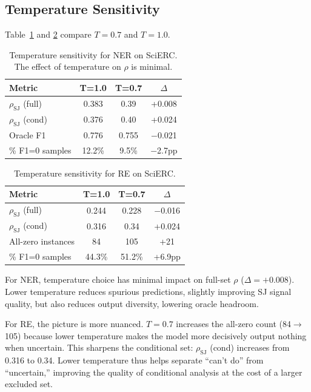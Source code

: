 \documentclass[11pt]{article}
\begin{document}
\subsection{Temperature Sensitivity}
\label{sec:temperature}

Table~\ref{tab:temp_ner} and \ref{tab:temp_re} compare $T{=}0.7$ and $T{=}1.0$.

\begin{table}[t]
\centering
\caption{Temperature sensitivity for NER on SciERC. The effect of temperature on $\rho$ is minimal.}
\label{tab:temp_ner}
\begin{tabular}{lccc}
\toprule
\textbf{Metric} & \textbf{T=1.0} & \textbf{T=0.7} & \textbf{$\Delta$} \\
\midrule
$\rho_{\text{SJ}}$ (full) & 0.383 & 0.39 & +0.008 \\
$\rho_{\text{SJ}}$ (cond) & 0.376 & 0.40 & +0.024 \\
Oracle F1                  & 0.776 & 0.755 & $-$0.021 \\
\% F1=0 samples            & 12.2\% & 9.5\% & $-$2.7pp \\
\bottomrule
\end{tabular}
\end{table}

\begin{table}[t]
\centering
\caption{Temperature sensitivity for RE on SciERC.}
\label{tab:temp_re}
\begin{tabular}{lccc}
\toprule
\textbf{Metric} & \textbf{T=1.0} & \textbf{T=0.7} & \textbf{$\Delta$} \\
\midrule
$\rho_{\text{SJ}}$ (full) & 0.244 & 0.228 & $-$0.016 \\
$\rho_{\text{SJ}}$ (cond) & 0.316 & 0.34  & +0.024 \\
All-zero instances          & 84    & 105   & +21 \\
\% F1=0 samples            & 44.3\% & 51.2\% & +6.9pp \\
\bottomrule
\end{tabular}
\end{table}

For NER, temperature choice has minimal impact on full-set $\rho$ ($\Delta{=}{+}0.008$).
Lower temperature reduces spurious predictions, slightly improving SJ signal quality, but also reduces output diversity, lowering oracle headroom.

For RE, the picture is more nuanced.
$T{=}0.7$ increases the all-zero count (84$\to$105) because lower temperature makes the model more decisively output nothing when uncertain.
This sharpens the conditional set: $\rho_{\text{SJ}}$ (cond) increases from 0.316 to 0.34.
Lower temperature thus helps separate ``can't do'' from ``uncertain,'' improving the quality of conditional analysis at the cost of a larger excluded set.
\end{document}
